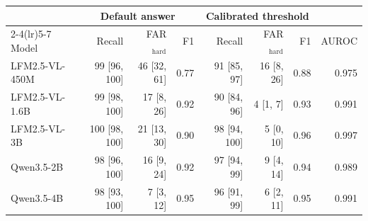 \begin{tabular}{lrrrrrrr}
\toprule
 & \multicolumn{3}{c}{Default answer} & \multicolumn{3}{c}{Calibrated threshold} & \\
\cmidrule(lr){2-4}\cmidrule(lr){5-7}
Model & Recall & FAR$_\text{hard}$ & F1 & Recall & FAR$_\text{hard}$ & F1 & AUROC \\
\midrule
LFM2.5-VL-450M & 99 \scriptsize[96, 100] & 46 \scriptsize[32, 61] & 0.77 & 91 \scriptsize[85, 97] & 16 \scriptsize[8, 26] & 0.88 & 0.975 \\
LFM2.5-VL-1.6B & 99 \scriptsize[98, 100] & 17 \scriptsize[8, 26] & 0.92 & 90 \scriptsize[84, 96] & 4 \scriptsize[1, 7] & 0.93 & 0.991 \\
LFM2.5-VL-3B & 100 \scriptsize[98, 100] & 21 \scriptsize[13, 30] & 0.90 & 98 \scriptsize[94, 100] & 5 \scriptsize[0, 10] & 0.96 & 0.997 \\
Qwen3.5-2B & 98 \scriptsize[96, 100] & 16 \scriptsize[9, 24] & 0.92 & 97 \scriptsize[94, 99] & 9 \scriptsize[4, 14] & 0.94 & 0.989 \\
Qwen3.5-4B & 98 \scriptsize[93, 100] & 7 \scriptsize[3, 12] & 0.95 & 96 \scriptsize[91, 99] & 6 \scriptsize[2, 11] & 0.95 & 0.991 \\
\bottomrule
\end{tabular}
